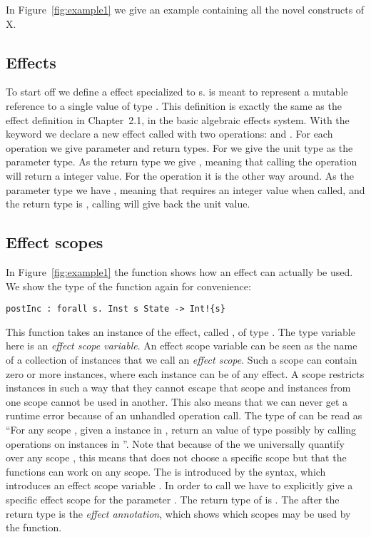In Figure~\ref{fig:example1} we give an example containing all the novel constructs of X.

\subsection{Effects}

To start off we define a  effect specialized to s.
 is meant to represent a mutable reference to a single value of type .
This definition is exactly the same as the  effect definition in Chapter~2.1, in the basic algebraic effects system.
With the  keyword we declare a new effect called  with two operations:  and .
For each operation we give parameter and return types. For  we give the unit type \ident{()} as the parameter type.
As the return type we give , meaning that calling the  operation will return a integer value.
For the  operation it is the other way around.
As the parameter type we have , meaning that  requires an integer value when called, and the return type is \ident{()}, calling  will give back the unit value.

\subsection{Effect scopes}
In Figure~\ref{fig:example1} the function  shows how an effect can actually be used.
We show the type of the function again for convenience:

\begin{verbatim}
postInc : forall s. Inst s State -> Int!{s}
\end{verbatim}

This function takes an instance of the  effect, called , of type .
The type variable  here is an \emph{effect scope variable}.
An effect scope variable can be seen as the name of a collection of instances that we call an \emph{effect scope}.
Such a scope can contain zero or more instances, where each instance can be of any effect.
A scope restricts instances in such a way that they cannot escape that scope and instances from one scope cannot be used in another.
This also means that we can never get a runtime error because of an unhandled operation call.
The type of  can be read as ``For any scope , given a  instance in , return an value of type  possibly by calling operations on instances in ''.
Note that because of the  we universally quantify over any scope , this means that  does not choose a specific scope but that the functions can work on any scope.
The  is introduced by the \ident{[s]} syntax, which introduces an effect scope variable .
In order to call  we have to explicitly give a specific effect scope for the parameter .
The return type of  is .
The  after the return type is the \emph{effect annotation}, which shows which scopes may be used by the function.

